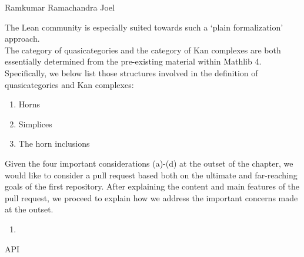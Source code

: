 \documentclass{book}
\begin{document}
Ramkumar Ramachandra
Joel

\fi

\iffalse
Needless to say, there are extensive differences between approaches to the study of ∞-categories and ∞-groupoids based in HoTT (homotopy type theory) and what some have called "plain foramlization". Such a plain formalization could make use of ETCC (elementary theory of the category of categories), which would involve defining the following structures along with corresponding results involving replacement for dependent types:

\begin{enumerate}
\item Category
\item Functor 
\item Natural$\_$Transformation
\item Equation (between natural transformations)
\end{enumerate}
\fi

The Lean community is especially suited towards such a `plain formalization' approach. \\

The category of quasicategories and the category of Kan complexes are both essentially determined from the pre-existing material within Mathlib 4. Specifically, we below list those structures involved in the definition of quasicategories and Kan complexes:

\begin{enumerate}
\item Horns
\item Simplices
\item The horn inclusions
\end{enumerate}

Given the four important considerations (a)-(d) at the outset of the chapter, we would like to consider a pull request based both on the ultimate and far-reaching goals of the first repository. After explaining the content and main features of the pull request, we proceed to explain how we address the important concerns made at the outset.

\begin{enumerate}
\item 
\end{enumerate}

API 




\iffalse
It is also important to explicitly name the category of quasicategories and the category of 
-
-
\fi
\end{document}
